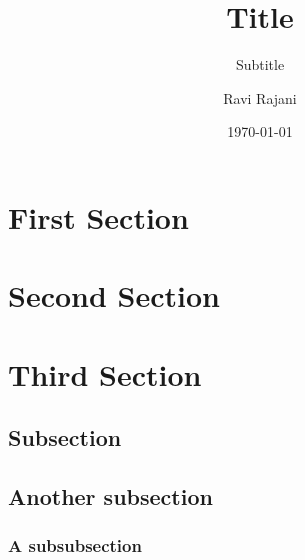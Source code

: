\documentclass[style=article]{tablet}
\title{Title}
\subtitle{Subtitle}
\author{Ravi Rajani}
\date{\today}
\begin{document}
\def\subbib{}
\maketitle
\section{First Section}
\lipsum
\section{Second Section}
\lipsum
\section{Third Section}
\subsection{Subsection}
\lipsum[1-2]
\subsection{Another subsection}
\lipsum[3-4]
\subsubsection{A subsubsection}
\lipsum[5-7]
%
\end{document}
